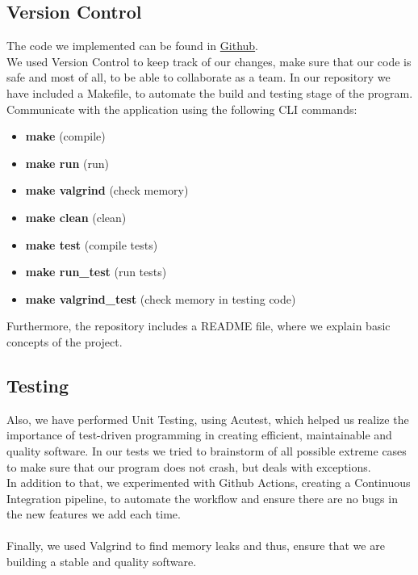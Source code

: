 \documentclass{article}
\begin{document}
\subsection{Version Control}
The code we implemented can be found in
\href{https://github.com/NefeliTav/Software-Development-for-Information-Systems}{Github}. \\
We used Version Control to keep track of our changes, make sure that our code is safe and most of all, to be able to collaborate as a team.
In our repository we have included a Makefile, to automate the build and testing stage of the program.  \\ 
Communicate with the application using the following CLI commands:
\begin{itemize}
  \item \textbf{make} (compile)
  \item \textbf{make run} (run)
  \item \textbf{make valgrind} (check memory)
  \item \textbf{make clean} (clean)
  \item \textbf{make test} (compile tests)
  \item \textbf{make run\_test} (run tests)
  \item \textbf{make valgrind\_test} (check memory in testing code)
\end{itemize}
Furthermore, the repository includes a README file, where we explain basic concepts of the project.
\subsection{Testing}
Also, we have performed Unit Testing, using Acutest, which helped us realize the importance of test-driven programming in creating efficient, maintainable and quality software. In our tests we tried to brainstorm of all possible extreme cases to make sure that our program does not crash, but deals with exceptions.\\
In addition to that, we experimented with Github Actions, creating a Continuous Integration pipeline, to automate the workflow and ensure there are no bugs in the new features we add each time.\\ \\
Finally, we used Valgrind to find memory leaks and thus, ensure that we are building a stable and quality software.
\end{document}
